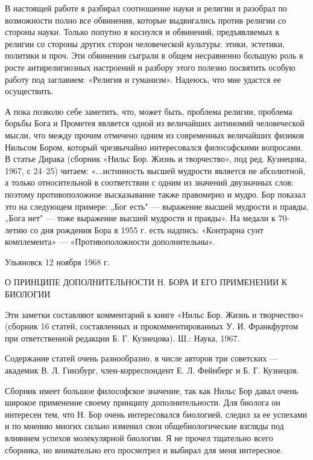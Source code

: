 В настоящей работе  я разбирал соотношение науки и  религии и разобрал
по возможности полно все обвинения, которые выдвигались против религии
со стороны науки. Только попутно я коснулся и обвинений, предъявляемых
к  религии  со стороны  других  сторон  человеческой культуры:  этики,
эстетики, политики и  проч. Эти обвинения сыграли  в общем несравненно
большую  роль  в  росте  антирелигиозных настроений  и  разбору  этого
полезно посвятить  особую работу под заглавием:  «Религия и гуманизм».
Надеюсь, что мне удастся ее осуществить.

А  пока позволю  себе  заметить, что,  может  быть, проблема  религии,
проблема  борьбы   Бога  и  Прометея  является   одной  из  величайших
антиномий  человеческой  мысли, что  между  прочим  отмечено одним  из
современных  величайших  физиков  Нильсом Бором,  который  чрезвычайно
интересовался философскими вопросами. В  статье Дирака (сборник «Нильс
Бор. Жизнь и творчество», под  ред. Кузнецова, 1967, с 24--25) читаем:
«...истинность  высшей  мудрости  является  не  абсолютной,  а  только
относительной  в соответствии  с  одним из  значений двузначных  слов:
поэтому  противоположное высказывание  также правомерно  и мудро.  Бор
показал  это на  следующем примере:  „Бог есть"  --- выражение  высшей
мудрости и  правды, „Бога  нет" --- тоже  выражение высшей  мудрости и
правды».  На  медали  к  70-летию  со дня  рождения  Бора  в  1955  г.
есть  надпись:  «Контрарна  сунт комплемента»  ---  «Противоположности
дополнительны».

Ульяновск 12 ноября 1968 г.

О ПРИНЦИПЕ ДОПОЛНИТЕЛЬНОСТИ Н. БОРА И ЕГО ПРИМЕНЕНИИ К БИОЛОГИИ

Эти  заметки  составляют  комментарий  к книге  «Нильс  Бор.  Жизнь  и
творчество» (сборник 16 статей,  составленных и прокомментированных У.
И. Франкфуртом при ответственной редакции Б. Г. Кузнецова). Ш.: Наука,
1967.

Содержание статей  очень разнообразно,  в числе авторов  три советских
--- академик В. Л. Гинзбург, член-корреспондент Е. Л. Фейнберг и Б. Г.
Кузнецов.

Сборник имеет  большое философское значение,  так как Нильс  Бор давал
очень широкое применение своему принципу дополнительности. Для биолога
он интересен тем, что Н.  Бор очень интересовался биологией, следил за
ее успехами и  по мнению многих сильно  изменил свои общебиологические
взгляды  под  влиянием  успехов  молекулярной биологии.  Я  не  прочел
тщательно всего сборника, но внимательно  его просмотрел и выбирал для
меня интересное.


